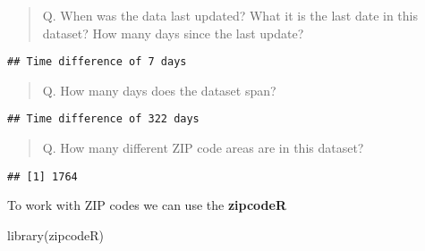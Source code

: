 \documentclass[
]{article}
\newenvironment{Shaded}{\begin{snugshade}}{\end{snugshade}}
\newcommand{\DecValTok}[1]{\textcolor[rgb]{0.00,0.00,0.81}{#1}}
\newcommand{\FunctionTok}[1]{\textcolor[rgb]{0.00,0.00,0.00}{#1}}
\newcommand{\NormalTok}[1]{#1}
\newcommand{\SpecialCharTok}[1]{\textcolor[rgb]{0.00,0.00,0.00}{#1}}
\begin{document}
\begin{quote}
Q. When was the data last updated? What it is the last date in this
dataset? How many days since the last update?
\end{quote}

\begin{Shaded}
\end{Shaded}

\begin{verbatim}
## Time difference of 7 days
\end{verbatim}

\begin{quote}
Q. How many days does the dataset span?
\end{quote}

\begin{Shaded}
\end{Shaded}

\begin{verbatim}
## Time difference of 322 days
\end{verbatim}

\begin{quote}
Q. How many different ZIP code areas are in this dataset?
\end{quote}

\begin{Shaded}
\end{Shaded}

\begin{verbatim}
## [1] 1764
\end{verbatim}

To work with ZIP codes we can use the \textbf{zipcodeR}

\begin{Shaded}
\begin{Highlighting}[]
\FunctionTok{library}\NormalTok{(zipcodeR)}
\end{Highlighting}
\end{Shaded}
\end{document}
